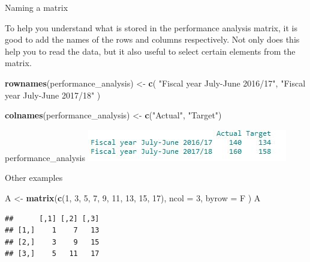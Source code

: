 \documentclass[
  ignorenonframetext,
]{beamer}
\newenvironment{Shaded}{\begin{snugshade}}{\end{snugshade}}
\newcommand{\DataTypeTok}[1]{\textcolor[rgb]{0.13,0.29,0.53}{#1}}
\newcommand{\DecValTok}[1]{\textcolor[rgb]{0.00,0.00,0.81}{#1}}
\newcommand{\KeywordTok}[1]{\textcolor[rgb]{0.13,0.29,0.53}{\textbf{#1}}}
\newcommand{\NormalTok}[1]{#1}
\newcommand{\StringTok}[1]{\textcolor[rgb]{0.31,0.60,0.02}{#1}}
\begin{document}
\begin{frame}[fragile]{Naming a matrix}
\protect\hypertarget{naming-a-matrix}{}

To help you understand what is stored in the performance analysis
matrix, it is good to add the names of the rows and columns
respectively. Not only does this help you to read the data, but it also
useful to select certain elements from the matrix.

\begin{Shaded}
\begin{Highlighting}[]
\KeywordTok{rownames}\NormalTok{(performance_analysis) <-}
\StringTok{  }\KeywordTok{c}\NormalTok{(}
    \StringTok{"Fiscal year July-June 2016/17"}\NormalTok{,}
    \StringTok{"Fiscal year July-June 2017/18"}
\NormalTok{  )}

\KeywordTok{colnames}\NormalTok{(performance_analysis) <-}\StringTok{ }\KeywordTok{c}\NormalTok{(}\StringTok{"Actual"}\NormalTok{, }\StringTok{"Target"}\NormalTok{)}

\end{Highlighting}
\end{Shaded}
\end{frame}

\begin{frame}
\NormalTok{performance\_analysis}
\includegraphics{Images/matrix.JPG}
\end{frame}


\begin{frame}[fragile]{Other examples}
\protect\hypertarget{other-examples}{}

\begin{Shaded}
\begin{Highlighting}[]
\NormalTok{A <-}\StringTok{ }\KeywordTok{matrix}\NormalTok{(}\KeywordTok{c}\NormalTok{(}\DecValTok{1}\NormalTok{, }\DecValTok{3}\NormalTok{, }\DecValTok{5}\NormalTok{, }\DecValTok{7}\NormalTok{, }\DecValTok{9}\NormalTok{, }\DecValTok{11}\NormalTok{, }\DecValTok{13}\NormalTok{, }\DecValTok{15}\NormalTok{, }\DecValTok{17}\NormalTok{),}
  \DataTypeTok{ncol =} \DecValTok{3}\NormalTok{,}
  \DataTypeTok{byrow =}\NormalTok{ F}
\NormalTok{)}
\NormalTok{A}
\end{Highlighting}
\end{Shaded}

\begin{verbatim}
##      [,1] [,2] [,3]
## [1,]    1    7   13
## [2,]    3    9   15
## [3,]    5   11   17
\end{verbatim}

\end{frame}
\end{document}
